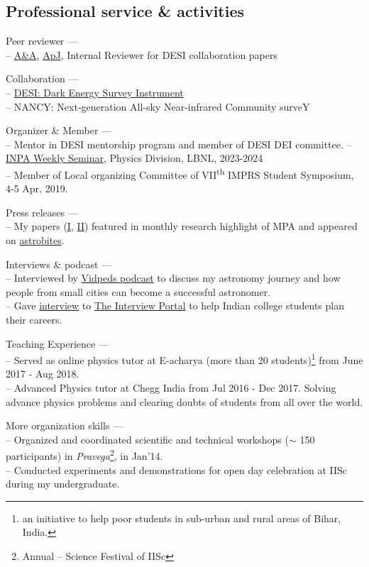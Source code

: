 \documentclass[12pt,letterpaper]{article}
\begin{document}
\subsection{Professional service \& activities}
\begin{list}{}{\cvlist}
    \item Peer reviewer --- \\
    -- \href{https://en.wikipedia.org/wiki/Astronomy_%26_Astrophysics}{A\&A}, \href{https://en.wikipedia.org/wiki/The_Astrophysical_Journal}{ApJ}, Internal Reviewer for DESI collaboration papers
    \item Collaboration --- \\
        -- \href{https://www.desi.lbl.gov/}{DESI: Dark Energy Survey Instrument} \\
        -- NANCY: Next-generation All-sky Near-infrared Community surveY
    \item Organizer \& Member --- \\
        -- Mentor in DESI mentorship program and member of DESI DEI committee.
        -- \href{https://inpa.lbl.gov/events/}{INPA Weekly Seminar}, Physics Division, LBNL, 2023-2024 \\
        -- Member of Local organizing Committee of VII\textsuperscript{th} IMPRS Student Symposium, 4-5 Apr, 2019.
    \item Press releases --- \\
        -- My papers (\href{https://www.mpa-garching.mpg.de/964620/hl202107}{I}, \href{https://www.mpa-garching.mpg.de/1066558/hl202211?c=27981}{II}) featured in monthly research highlight of MPA and appeared on \href{https://astrobites.org/2021/05/06/cool-metal-gas-search-thanks-it-was-automated/}{astrobites}.
    \item Interviews \& podcast --- \\
      -- Interviewed by \href{https://www.youtube.com/watch?v=WmA_PnYLeCg}{Vidpeds podcast} to discuss my astronomy journey and how people from small cities can become a successful astronomer. \\
      -- Gave \href{https://theinterviewportal.com/2020/03/13/astrophysicist-interview-8/}{interview} to \href{https://theinterviewportal.com/}{The Interview Portal} to help Indian college students plan their careers.
    \item Teaching Experience --- \\
        -- Served as online physics tutor at E-acharya (more than 20 students)\footnote{an initiative to help poor students in sub-urban and rural areas of Bihar, India.} from June 2017 - Aug 2018. \\
        -- Advanced Physics tutor at Chegg India from Jul 2016 - Dec 2017. Solving advance physics problems and clearing doubts of students from all over the world.
  \item More organization skills --- \\
        -- Organized and coordinated scientific and technical workshops ($\sim$ 150 participants) in \emph{Pravega}\footnote{Annual -- Science Festival of IISc}, in Jan'14.\\
        -- Conducted experiments and demonstrations for open day celebration at IISc during my undergraduate.
\end{list}
\end{document}

